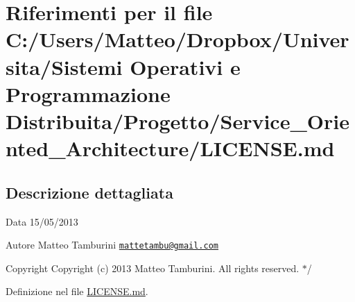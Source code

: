 \hypertarget{_l_i_c_e_n_s_e_8md}{\section{Riferimenti per il file C\-:/\-Users/\-Matteo/\-Dropbox/\-Universita/\-Sistemi Operativi e Programmazione Distribuita/\-Progetto/\-Service\-\_\-\-Oriented\-\_\-\-Architecture/\-L\-I\-C\-E\-N\-S\-E.md}
\label{_l_i_c_e_n_s_e_8md}
}


\subsection{Descrizione dettagliata}
\begin{DoxyDate}{Data}
15/05/2013 
\end{DoxyDate}
\begin{DoxyAuthor}{Autore}
Matteo Tamburini \href{mailto:mattetambu@gmail.com}{\tt mattetambu@gmail.\-com} 
\end{DoxyAuthor}
\begin{DoxyCopyright}{Copyright}
Copyright (c) 2013 Matteo Tamburini. All rights reserved. $\ast$/ 
\end{DoxyCopyright}


Definizione nel file \hyperlink{_l_i_c_e_n_s_e_8md_source}{L\-I\-C\-E\-N\-S\-E.\-md}.

